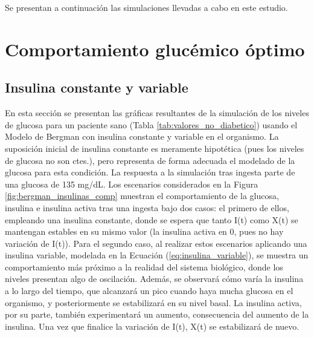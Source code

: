 
Se presentan a continuación las simulaciones llevadas a cabo en este estudio.

\section{Comportamiento glucémico óptimo}
\subsection{Insulina constante y variable}

En esta sección se presentan las gráficas resultantes de la simulación de los niveles de glucosa para un paciente sano (Tabla \ref{tab:valores_no_diabetico}) usando el Modelo de Bergman con insulina constante y variable en el organismo. La suposición inicial de insulina constante es meramente hipotética (pues los niveles de glucosa no son ctes.), pero representa de forma adecuada el modelado de la glucosa para esta condición. La respuesta a la simulación tras ingesta parte de una glucosa de 135 mg/dL.
Los escenarios considerados en la Figura \ref{fig:bergman_insulinas_comp} muestran el comportamiento de la glucosa, insulina e insulina activa tras una ingesta bajo dos casos: el primero de ellos, empleando una insulina constante, donde se espera que tanto I(t) como X(t) se mantengan estables en su mismo valor (la insulina activa en 0, pues no hay variación de I(t)). Para el segundo caso, al realizar estos escenarios aplicando una insulina variable, modelada en la Ecuación (\ref{eq:insulina_variable}), se muestra un comportamiento más próximo a la realidad del sistema biológico, donde los niveles presentan algo de oscilación. Además, se observará cómo varía la insulina a lo largo del tiempo, que alcanzará un pico cuando haya mucha glucosa en el organismo, y posteriormente se estabilizará en su nivel basal. La insulina activa, por su parte, también experimentará un aumento, consecuencia del aumento de la insulina. Una vez que finalice la variación de I(t), X(t) se estabilizará de nuevo.
\clearpage


